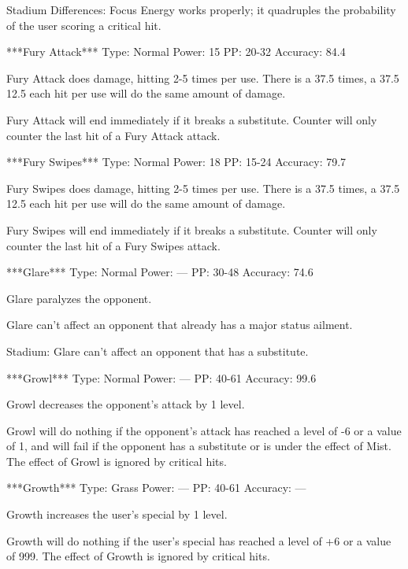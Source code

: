 \documentclass[reprint, aps, prl, paper=A4]{revtex4-1}
\begin{document}
Stadium Differences:
Focus Energy works properly; it quadruples the probability of the user scoring a critical hit.


***Fury Attack***
Type: Normal
Power: 15
PP: 20-32
Accuracy: 84.4%

Fury Attack does damage, hitting 2-5 times per use. There is a 37.5%
times, a 37.5%
12.5%
each hit per use will do the same amount of damage.

Fury Attack will end immediately if it breaks a substitute. Counter will only counter the last
hit of a Fury Attack attack.


***Fury Swipes***
Type: Normal
Power: 18
PP: 15-24
Accuracy: 79.7%

Fury Swipes does damage, hitting 2-5 times per use. There is a 37.5%
times, a 37.5%
12.5%
each hit per use will do the same amount of damage.

Fury Swipes will end immediately if it breaks a substitute. Counter will only counter the last
hit of a Fury Swipes attack.


***Glare***
Type: Normal
Power: ---
PP: 30-48
Accuracy: 74.6%

Glare paralyzes the opponent.

Glare can't affect an opponent that already has a major status ailment.

Stadium:
Glare can't affect an opponent that has a substitute.


***Growl***
Type: Normal
Power: ---
PP: 40-61
Accuracy: 99.6%

Growl decreases the opponent's attack by 1 level.

Growl will do nothing if the opponent's attack has reached a level of -6 or a value of 1, and
will fail if the opponent has a substitute or is under the effect of Mist. The effect of Growl
is ignored by critical hits.


***Growth***
Type: Grass
Power: ---
PP: 40-61
Accuracy: ---

Growth increases the user's special by 1 level.

Growth will do nothing if the user's special has reached a level of +6 or a value of 999. The
effect of Growth is ignored by critical hits.
\end{document}
